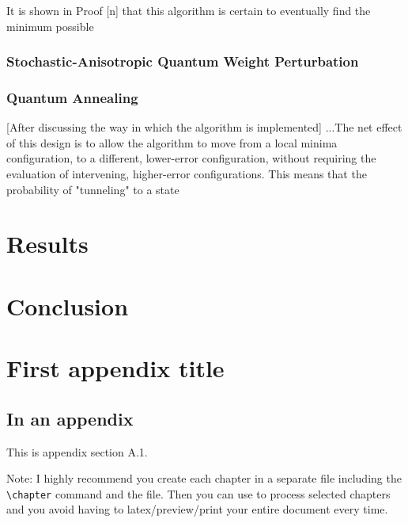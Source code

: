 \documentclass[11pt]{afthesis}
\begin{document}
It is shown in Proof [n] that this algorithm is certain to eventually find the minimum possible


\subsection{Stochastic-Anisotropic Quantum Weight Perturbation}



\subsection{Quantum Annealing}


[After discussing the way in which the algorithm is implemented] ...The net effect of this design is to allow the algorithm to move from a local minima configuration, to a different, lower-error configuration, without requiring the evaluation of intervening, higher-error configurations. This means that the probability of "tunneling" to a state




\chapter{Results}
\chapter{Conclusion}


\appendix		%

\chapter{First appendix title}

\section{In an appendix} 

This is appendix section A.1.

Note: I highly recommend you create each chapter in a separate file
including the \verb|\chapter| command and \verb|| the file.
Then you can use \verb|| to process selected chapters and
you avoid having to latex/preview/print your entire document every
time.
\end{document}
